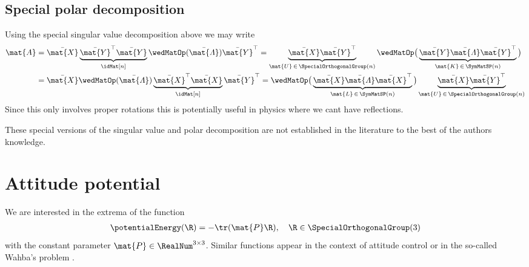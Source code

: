\subsection{Special polar decomposition}
Using the special singular value decomposition above we may write
\begin{subequations}
\begin{align}
 \mat{A} 
 &= \bar{\mat{X}} \underbrace{\bar{\mat{Y}}^\top \bar{\mat{Y}}}_{\idMat[n]} \wedMatOp(\bar{\mat{\varLambda}}) \bar{\mat{Y}}^\top
 = \underbrace{\bar{\mat{X}} \bar{\mat{Y}}^\top}_{\mat{U}\,\in\,\SpecialOrthogonalGroup(n)} \wedMatOp\big(\underbrace{\bar{\mat{Y}} \bar{\mat{\varLambda}} \bar{\mat{Y}}^\top}_{\mat{K}\,\in\,\SymMatSP(n)}\big)
\\
 &= \bar{\mat{X}} \wedMatOp(\bar{\mat{\varLambda}}) \underbrace{\bar{\mat{X}}^\top \bar{\mat{X}}}_{\idMat[n]} \bar{\mat{Y}}^\top
 = \wedMatOp\big(\underbrace{\bar{\mat{X}} \bar{\mat{\varLambda}} \bar{\mat{X}}^\top}_{\mat{L}\,\in\,\SymMatSP(n)}\big) \underbrace{\bar{\mat{X}} \bar{\mat{Y}}^\top}_{\mat{U}\,\in\,\SpecialOrthogonalGroup(n)}
\end{align}
\end{subequations}
Since this only involves proper rotations this is potentially useful in physics where we cant have reflections.

These special versions of the singular value and polar decomposition are not established in the literature to the best of the authors knowledge.


\section{Attitude potential}\label{sec:AppendixAttitudePotential}
We are interested in the extrema of the function
\begin{align}
 \potentialEnergy(\R) = -\tr(\mat{P} \R), \quad \R \in \SpecialOrthogonalGroup(3)
\end{align}
with the constant parameter $\mat{P} \in \RealNum^{3\times3}$.
Similar functions appear in the context of attitude control \cite{Koditschek:TotalEnergy} or in the so-called Wahba's problem \cite{Wahba:WahbaProblem}.

